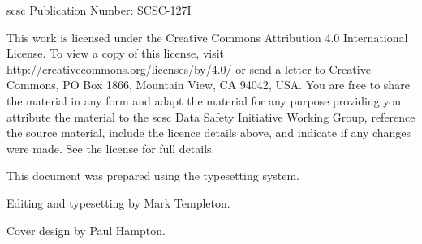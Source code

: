 %
%

%
%

\pagestyle{FirstPageFrontCover}
%
%



\acrshort{scsc} Publication Number: SCSC-127I%

This work is licensed under the Creative Commons Attribution 4.0 International License. To view a copy of this license, visit \href{http://creativecommons.org/licenses/by/4.0/}{http://creativecommons.org/licenses/by/4.0/} or send a letter to Creative Commons, PO Box 1866, Mountain View, CA 94042, USA\@. You are free to share the material in any form and adapt the material for any purpose providing you attribute the material to the \gls{scsc} Data Safety Initiative Working Group, reference the source material, include the licence details above, and indicate if any changes were made.  See the license for full details.

This document was prepared using the \LaTeXe\/ typesetting system.

Editing and typesetting by Mark Templeton.

Cover design by Paul Hampton.



\clearpage
\pagestyle{ContinuationInsideFrontCover}

